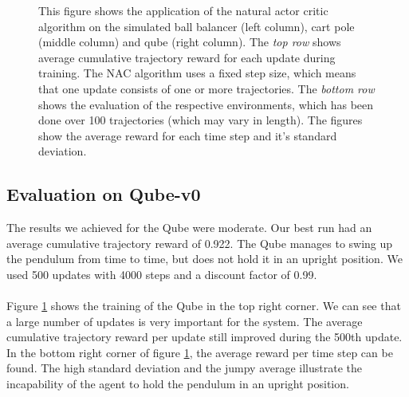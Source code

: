 \begin{figure}
\begin{center}
		\hspace{1.5mm}
		\caption{This figure shows the application of the natural actor critic algorithm on the simulated ball balancer (left column), cart pole (middle column) and qube (right column). The \textit{top row} shows average cumulative trajectory reward for each update during training. The NAC algorithm uses a fixed step size, which means that one update consists of one or more trajectories. The\textit{ bottom row} shows the evaluation of the respective environments, which has been done over 100 trajectories (which may vary in length). The figures show the average reward for each time step and it's standard deviation.}
		\label{fig:nac}
	\end{center}
\end{figure}

\subsection{Evaluation on Qube-v0}
The results we achieved for the Qube were moderate. Our best run had an average cumulative trajectory reward of 0.922. The Qube manages to swing up the pendulum from time to time, but does not hold it in an upright position. We used 500 updates with 4000 steps and a discount factor of 0.99. \\
\\
Figure \ref{fig:nac} shows the training of the Qube in the top right corner. We can see that a large number of updates is very important for the system. The average cumulative trajectory reward per update still improved during the 500th update. In the bottom right corner of figure \ref{fig:nac}, the average reward per time step can be found. The high standard deviation and the jumpy average illustrate the incapability of the agent to hold the pendulum in an upright position.

\newpage
